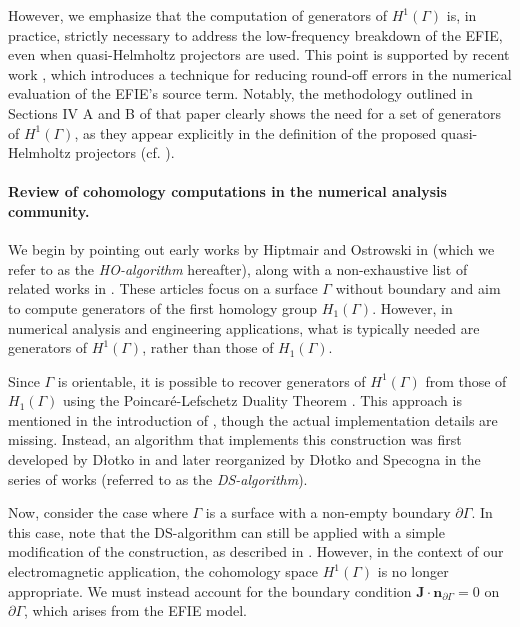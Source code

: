 \documentclass[a4paper,twoside,10pt]{article}
\theoremstyle{plain}
\theoremstyle{definition}
\theoremstyle{remark}
\begin{document}
However, we emphasize that the computation of generators of $H^1(\Gamma)$ is, in practice, strictly necessary to address the low-frequency breakdown of the EFIE, even when quasi-Helmholtz projectors are used.
This point is supported by recent work \cite{hofmann2023low}, which introduces a technique for reducing round-off errors in the numerical evaluation of the EFIE's source term.
Notably, the methodology outlined in Sections IV A and B of that paper clearly shows the need for a set of generators of $H^1(\Gamma)$, as they appear explicitly in the definition of the proposed quasi-Helmholtz projectors (cf. \cite[Equations (24)--(28)]{hofmann2023low}).
\paragraph*{Review of cohomology computations in the numerical analysis community.}
We begin by pointing out early works by Hiptmair and Ostrowski in \cite{hiptmair2002generators} (which we refer to as the \emph{HO-algorithm} hereafter), along with a non-exhaustive list of related works in \cite{Eppstein2002DynamicGO, lazarus2001computing, dey2013efficient}.
These articles focus on a surface $\Gamma$ without boundary and aim to compute generators of the first homology group $H_1(\Gamma)$.
However, in numerical analysis and engineering applications, what is typically needed are generators of $H^1(\Gamma)$, rather than those of $H_1(\Gamma)$.

Since $\Gamma$ is orientable, it is possible to recover generators of $H^1(\Gamma)$ from those of $H_1(\Gamma)$ using the Poincar\'e-Lefschetz Duality Theorem \cite{gross2004electromagnetic}.
This approach is mentioned in the introduction of \cite{hiptmair2002generators}, though the actual implementation details are missing.
Instead, an algorithm that implements this construction was first developed by D\l{}otko in \cite{dlotko2012fast} and later reorganized by D\l{}otko and Specogna in the series of works \cite{dlotko2013physics, dlotko2014lazy} (referred to as the \emph{DS-algorithm}).

Now, consider the case where $\Gamma$ is a surface with a non-empty boundary $\partial \Gamma$.
In this case, note that the DS-algorithm can still be applied with a simple modification of the construction, as described in \cite[Section 6]{dlotko2012fast}.
However, in the context of our electromagnetic application, the cohomology space $H^1(\Gamma)$ is no longer appropriate.
We must instead account for the boundary condition $\bm J \cdot \bm n_{\partial \Gamma} = 0$ on $\partial \Gamma$, which arises from the EFIE model.
\end{document}
